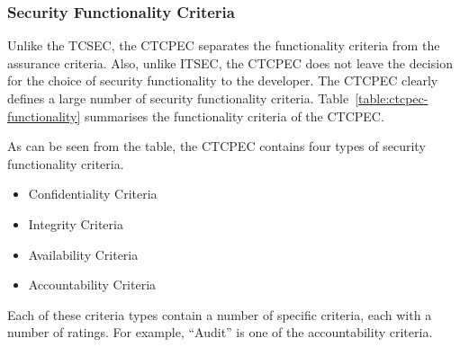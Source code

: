     \subsubsection{Security Functionality Criteria}
    Unlike the TCSEC, the CTCPEC separates the functionality criteria from the assurance criteria.
    Also, unlike ITSEC, the CTCPEC does not leave the decision for the choice of security functionality 
    to the developer. The CTCPEC clearly defines a large number of security functionality criteria.
    Table~\ref{table:ctcpec-functionality} summarises the functionality criteria
    of the CTCPEC.

    As can be seen from the table, the CTCPEC contains four types of security
    functionality criteria.
        \begin{itemize}
            \item Confidentiality Criteria
            \item Integrity Criteria
            \item Availability Criteria
            \item Accountability Criteria
        \end{itemize}
    Each of these criteria types contain a number of specific criteria, each with
    a number of ratings. For example, ``Audit'' is one of the accountability
    criteria. 
    
